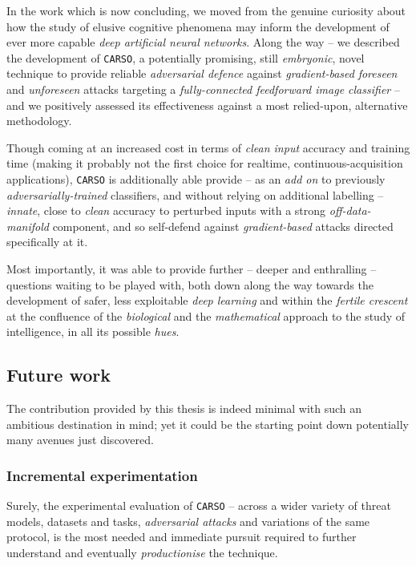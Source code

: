 

In the work which is now concluding, we moved from the genuine curiosity about how the study of elusive cognitive phenomena may inform the development of ever more capable \textit{deep artificial neural networks}. Along the way -- we described the development of \texttt{CARSO}, a potentially promising, still \textit{embryonic}, novel technique to provide reliable \textit{adversarial defence} against \textit{gradient-based} \textit{foreseen} and \textit{unforeseen} attacks targeting a \textit{fully-connected feedforward image classifier} -- and we positively assessed its effectiveness against a most relied-upon, alternative methodology.

Though coming at an increased cost in terms of \textit{clean input} accuracy and training time (making it probably not the first choice for realtime, continuous-acquisition applications), \texttt{CARSO} is additionally able provide -- as an \textit{add on} to previously \textit{adversarially-trained} classifiers, and without relying on additional labelling -- \textit{innate}, close to \textit{clean} accuracy to perturbed inputs with a strong \textit{off-data-manifold} component, and so self-defend against \textit{gradient-based} attacks directed specifically at it.

Most importantly, it was able to provide further -- deeper and enthralling -- questions waiting to be played with, both down along the way towards the development of safer, less exploitable \textit{deep learning} and within the \textit{fertile crescent} at the confluence of the \textit{biological} and the \textit{mathematical} approach to the study of intelligence, in all its possible \textit{hues}.


\subsection{Future work}

The contribution provided by this thesis is indeed minimal with such an ambitious destination in mind; yet it could be the starting point down potentially many avenues just discovered.

\subsubsection{Incremental experimentation}

Surely, the experimental evaluation of \texttt{CARSO} -- across a wider variety of threat models, datasets and tasks, \textit{adversarial attacks} and variations of the same protocol, is the most needed and immediate pursuit required to further understand and eventually \textit{productionise} the technique.

